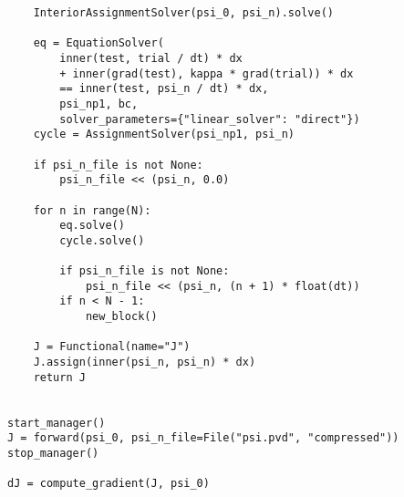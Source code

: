 \documentclass[11pt]{article}
\begin{document}
\begin{lstlisting}
    InteriorAssignmentSolver(psi_0, psi_n).solve()

    eq = EquationSolver(
        inner(test, trial / dt) * dx
        + inner(grad(test), kappa * grad(trial)) * dx
        == inner(test, psi_n / dt) * dx,
        psi_np1, bc,
        solver_parameters={"linear_solver": "direct"})
    cycle = AssignmentSolver(psi_np1, psi_n)

    if psi_n_file is not None:
        psi_n_file << (psi_n, 0.0)

    for n in range(N):
        eq.solve()
        cycle.solve()

        if psi_n_file is not None:
            psi_n_file << (psi_n, (n + 1) * float(dt))
        if n < N - 1:
            new_block()

    J = Functional(name="J")
    J.assign(inner(psi_n, psi_n) * dx)
    return J


start_manager()
J = forward(psi_0, psi_n_file=File("psi.pvd", "compressed"))
stop_manager()

dJ = compute_gradient(J, psi_0)
\end{lstlisting}
\end{document}

